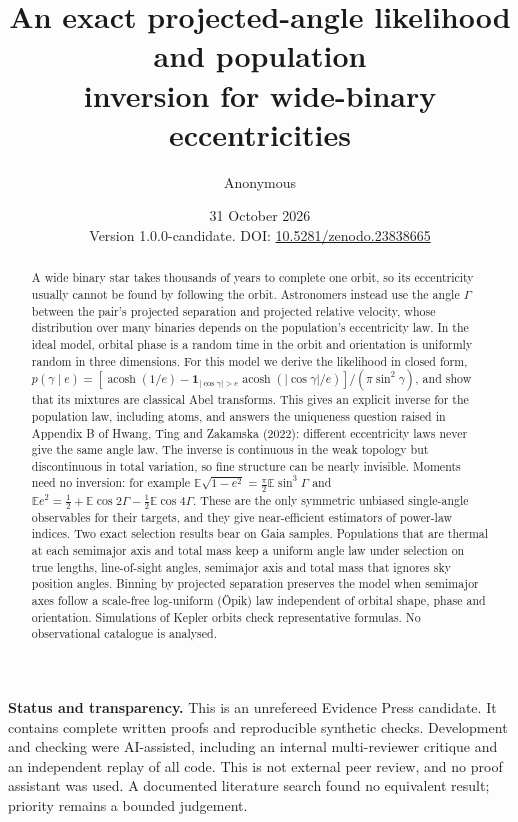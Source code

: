 \documentclass[11pt,a4paper]{article}
\title{\textbf{An exact projected-angle likelihood and population\\inversion for wide-binary eccentricities}}
\author{Anonymous}
\date{31 October 2026\\[2pt]\small Version 1.0.0-candidate. DOI: \href{https://doi.org/10.5281/zenodo.23838665}{10.5281/zenodo.23838665}}
\theoremstyle{remark}\newtheorem{remark}[theorem]{Remark}
\DeclareMathOperator{\acosh}{acosh}
\newcommand{\E}{\mathbb E}
\newcommand{\ind}{\mathbf 1}
\begin{document}
\maketitle
\vspace{-1em}
\begin{abstract}
A wide binary star takes thousands of years to complete one orbit, so its eccentricity usually cannot be found by following the orbit. Astronomers instead use the angle $\Gamma$ between the pair's projected separation and projected relative velocity, whose distribution over many binaries depends on the population's eccentricity law. In the ideal model, orbital phase is a random time in the orbit and orientation is uniformly random in three dimensions. For this model we derive the likelihood in closed form, $p(\gamma\mid e)=[\acosh(1/e)-\ind_{|\cos\gamma|>e}\acosh(|\cos\gamma|/e)]/(\pi\sin^2\gamma)$, and show that its mixtures are classical Abel transforms. This gives an explicit inverse for the population law, including atoms, and answers the uniqueness question raised in Appendix B of Hwang, Ting and Zakamska (2022): different eccentricity laws never give the same angle law. The inverse is continuous in the weak topology but discontinuous in total variation, so fine structure can be nearly invisible. Moments need no inversion: for example $\E\sqrt{1-e^2}=\tfrac\pi2\E\sin^3\Gamma$ and $\E e^2=\tfrac12+\E\cos2\Gamma-\tfrac12\E\cos4\Gamma$. These are the only symmetric unbiased single-angle observables for their targets, and they give near-efficient estimators of power-law indices. Two exact selection results bear on Gaia samples. Populations that are thermal at each semimajor axis and total mass keep a uniform angle law under selection on true lengths, line-of-sight angles, semimajor axis and total mass that ignores sky position angles. Binning by projected separation preserves the model when semimajor axes follow a scale-free log-uniform (\"Opik) law independent of orbital shape, phase and orientation. Simulations of Kepler orbits check representative formulas. No observational catalogue is analysed.
\end{abstract}

\smallskip
\textbf{Status and transparency.} This is an unrefereed Evidence Press candidate. It contains complete written proofs and reproducible synthetic checks. Development and checking were AI-assisted, including an internal multi-reviewer critique and an independent replay of all code. This is not external peer review, and no proof assistant was used. A documented literature search found no equivalent result; priority remains a bounded judgement.
\end{document}
